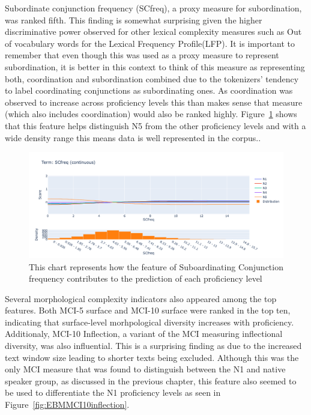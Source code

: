 Subordinate conjunction frequency (SCfreq), a proxy measure for subordination, was ranked fifth. This finding is
somewhat surprising given the higher discriminative power observed for other lexical complexity measures such as Out
of vocabulary words for the Lexical Frequency Profile(LFP). It is important to remember that even though this was
used as a proxy measure to represent subordination, it is better in this context to think of this measure as
representing both, coordination and subordination combined due to the tokenizers' tendency to label coordinating
conjunctions
as subordinating ones. As coordination was observed to increase across proficiency levels this than makes sense that
measure (which also includes coordination) would also be ranked highly. Figure~\ref{fig:EBMSCfreq} shows that this
feature helps distinguish N5 from the other proficiency levels and with a wide density range this means data is
well represented in the corpus..

\begin{figure}[h!]
    \centering
    \includegraphics[scale=.4]{img/EBM/EBMSCfreq}
    \caption[Contribution of Subordinating Conjuction Frequency]{This chart represents how the feature of Suboardinating Conjunction frequency contributes to the prediction of each proficiency level}
    \label{fig:EBMSCfreq}
\end{figure}

Several morphological complexity indicators also appeared among the top features. Both MCI-5 surface and MCI-10
surface were ranked in the top ten, indicating that surface-level morhpological diversity increases with
proficiency. Additionaly, MCI-10 Inflection, a variant of the MCI measuring inflectional diversity, was also
influential. This is a surprising finding as due to the increased text window size leading to shorter texts being
 excluded. Although this was the only MCI measure that was found to distinguish between the N1 and native speaker
group, as discussed in the previous chapter, this feature also seemed to be used to differentiate the N1 proficiency
levels as seen in Figure~\ref{fig:EBMMCI10inflection}.

